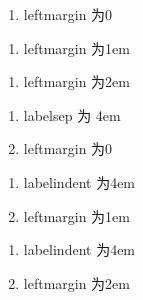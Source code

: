 \documentclass{ctexart}
\begin{document}
\begin{enumerate}[leftmargin={0em}]
\item leftmargin 为0
\end{enumerate}

\begin{enumerate}[leftmargin={1em}]
\item leftmargin 为1em
\end{enumerate}


\begin{enumerate}[leftmargin={2em}]
\item leftmargin 为2em
\end{enumerate}


\begin{enumerate}[labelsep={4em},leftmargin={9em}]
\item labelsep 为 4em
\item leftmargin 为0
\end{enumerate}

\begin{enumerate}[labelindent={4em},leftmargin={1em}]
\item labelindent 为4em
\item leftmargin 为1em
\end{enumerate}


\begin{enumerate}[labelindent={4em},leftmargin={2em}]
\item labelindent 为4em
\item leftmargin 为2em
\end{enumerate}
\end{document}
